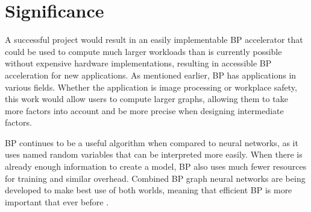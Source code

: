 \section*{Significance}

A successful project would result in an easily implementable BP accelerator that could be used to compute much larger workloads than is currently possible without expensive hardware implementations, resulting in accessible BP acceleration for new applications. As mentioned earlier, BP has applications in various fields. Whether the application is image processing or workplace safety, this work would allow users to compute larger graphs, allowing them to take more factors into account and be more precise when designing intermediate factors.

BP continues to be a useful algorithm when compared to neural networks, as it uses named random variables that can be interpreted more easily. When there is already enough information to create a model, BP also uses much fewer resources for training and similar overhead. Combined BP graph neural networks are being developed to make best use of both worlds, meaning that efficient BP is more important that ever before \cite{Jia_Baykal_Potluru_Benson_2021}. 
